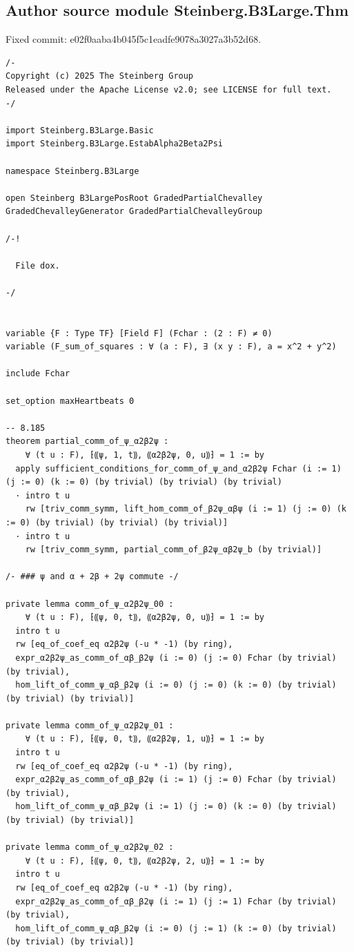 \documentclass[10pt,a4paper]{article}
\begin{document}
\subsection*{Author source module Steinberg.B3Large.Thm}
\noindent Fixed commit: e02f0aaba4b045f5c1eadfe9078a3027a3b52d68.
\begin{Verbatim}
/-
Copyright (c) 2025 The Steinberg Group
Released under the Apache License v2.0; see LICENSE for full text.
-/

import Steinberg.B3Large.Basic
import Steinberg.B3Large.EstabAlpha2Beta2Psi

namespace Steinberg.B3Large

open Steinberg B3LargePosRoot GradedPartialChevalley GradedChevalleyGenerator GradedPartialChevalleyGroup

/-!

  File dox.

-/


variable {F : Type TF} [Field F] (Fchar : (2 : F) ≠ 0)
variable (F_sum_of_squares : ∀ (a : F), ∃ (x y : F), a = x^2 + y^2)

include Fchar

set_option maxHeartbeats 0

-- 8.185
theorem partial_comm_of_ψ_α2β2ψ :
    ∀ (t u : F), ⁅⸨ψ, 1, t⸩, ⸨α2β2ψ, 0, u⸩⁆ = 1 := by
  apply sufficient_conditions_for_comm_of_ψ_and_α2β2ψ Fchar (i := 1) (j := 0) (k := 0) (by trivial) (by trivial) (by trivial)
  · intro t u
    rw [triv_comm_symm, lift_hom_comm_of_β2ψ_αβψ (i := 1) (j := 0) (k := 0) (by trivial) (by trivial) (by trivial)]
  · intro t u
    rw [triv_comm_symm, partial_comm_of_β2ψ_αβ2ψ_b (by trivial)]

/- ### ψ and α + 2β + 2ψ commute -/

private lemma comm_of_ψ_α2β2ψ_00 :
    ∀ (t u : F), ⁅⸨ψ, 0, t⸩, ⸨α2β2ψ, 0, u⸩⁆ = 1 := by
  intro t u
  rw [eq_of_coef_eq α2β2ψ (-u * -1) (by ring),
  expr_α2β2ψ_as_comm_of_αβ_β2ψ (i := 0) (j := 0) Fchar (by trivial) (by trivial),
  hom_lift_of_comm_ψ_αβ_β2ψ (i := 0) (j := 0) (k := 0) (by trivial) (by trivial) (by trivial)]

private lemma comm_of_ψ_α2β2ψ_01 :
    ∀ (t u : F), ⁅⸨ψ, 0, t⸩, ⸨α2β2ψ, 1, u⸩⁆ = 1 := by
  intro t u
  rw [eq_of_coef_eq α2β2ψ (-u * -1) (by ring),
  expr_α2β2ψ_as_comm_of_αβ_β2ψ (i := 1) (j := 0) Fchar (by trivial) (by trivial),
  hom_lift_of_comm_ψ_αβ_β2ψ (i := 1) (j := 0) (k := 0) (by trivial) (by trivial) (by trivial)]

private lemma comm_of_ψ_α2β2ψ_02 :
    ∀ (t u : F), ⁅⸨ψ, 0, t⸩, ⸨α2β2ψ, 2, u⸩⁆ = 1 := by
  intro t u
  rw [eq_of_coef_eq α2β2ψ (-u * -1) (by ring),
  expr_α2β2ψ_as_comm_of_αβ_β2ψ (i := 1) (j := 1) Fchar (by trivial) (by trivial),
  hom_lift_of_comm_ψ_αβ_β2ψ (i := 0) (j := 1) (k := 0) (by trivial) (by trivial) (by trivial)]


\end{Verbatim}
\end{document}
